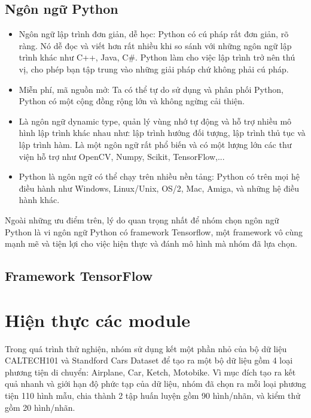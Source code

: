 \documentclass[a4paper,14pt]{extreport}
\begin{document}
\subsection{Ngôn ngữ Python}
\begin{itemize}
        \item Ngôn ngữ lập trình đơn giản, dễ học: Python có cú pháp rất đơn giản, rõ ràng. Nó dễ đọc và viết hơn rất nhiều khi so sánh với những ngôn ngữ lập trình khác như C++, Java, C#. Python làm cho việc lập trình trở nên thú vị, cho phép bạn tập trung vào những giải pháp chứ không phải cú pháp.
        \item Miễn phí, mã nguồn mở: Ta có thể tự do sử dụng và phân phối Python, Python có một cộng đồng rộng lớn và không ngừng cải thiện.
        \item Là ngôn ngữ dynamic type, quản lý vùng nhớ tự động và hỗ trợ nhiều mô hình lập trình khác nhau như: lập trình hướng đối tượng, lập trình thủ tục và lập trình hàm. Là một ngôn ngữ rất phổ biến và có một lượng lớn các thư viện hỗ trợ như OpenCV, Numpy, Scikit, TensorFlow,...
        \item Python là ngôn ngữ có thể chạy trên nhiều nền tảng: Python có trên mọi hệ điều hành như Windows, Linux/Unix, OS/2, Mac, Amiga, và những hệ điều hành khác.
\end{itemize}

Ngoài những ưu điểm trên, lý do quan trọng nhất để nhóm chọn ngôn ngữ Python là vi ngôn ngữ Python có framework Tensorflow, một framework vô cùng mạnh mẽ và tiện lợi cho việc hiện thực và đánh mô hình mà nhóm đã lựa chọn.

\subsection{Framework TensorFlow}



\section{Hiện thực các module}
Trong quá trình thử nghiện, nhóm sử dụng kết một phần nhỏ của bộ dữ liệu CALTECH101 và Standford Cars Dataset để tạo ra một bộ dữ liệu gồm 4 loại phương tiện di chuyển: Airplane, Car, Ketch, Motobike. Vì mục đích tạo ra kết quả nhanh và giới hạn độ phức tạp của dữ liệu, nhóm đã chọn ra mỗi loại phương tiện 110 hình mẫu, chia thành 2 tập huấn luyện gồm 90 hình/nhãn, và kiểm thử gồm 20 hình/nhãn.
\end{document}
